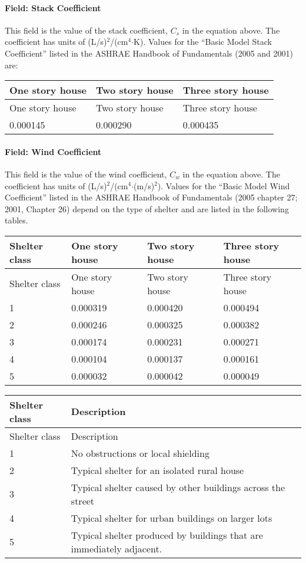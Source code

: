 \paragraph{Field: Stack Coefficient}\label{field-stack-coefficient}

This field is the value of the stack coefficient, \({C_s}\) in the equation above. The coefficient has units of (L/s)\(^{2}\)/(cm\(^{4}\)$\cdot$K). Values for the ``Basic Model Stack Coefficient'' listed in the ASHRAE Handbook of Fundamentals (2005 and 2001) are:

\begin{longtable}[c]{@{}lll@{}}
\toprule
One story house & Two story house & Three story house \tabularnewline
\midrule
\endfirsthead

\toprule
One story house & Two story house & Three story house \tabularnewline
\midrule
\endhead

0.000145 & 0.000290 & 0.000435 \tabularnewline
\bottomrule
\end{longtable}

\paragraph{Field: Wind Coefficient}\label{field-wind-coefficient}

This field is the value of the wind coefficient, \({C_w}\) in the equation above. The coefficient has units of (L/s)\(^{2}\)/(cm\(^{4}\)$\cdot$(m/s)\(^{2}\)). Values for the ``Basic Model Wind Coefficient'' listed in the ASHRAE Handbook of Fundamentals (2005 chapter 27; 2001, Chapter 26) depend on the type of shelter and are listed in the following tables.

\begin{longtable}[c]{@{}llll@{}}
\toprule
Shelter class & One story house & Two story house & Three story house \tabularnewline
\midrule
\endfirsthead

\toprule
Shelter class & One story house & Two story house & Three story house \tabularnewline
\midrule
\endhead

1 & 0.000319 & 0.000420 & 0.000494 \tabularnewline
2 & 0.000246 & 0.000325 & 0.000382 \tabularnewline
3 & 0.000174 & 0.000231 & 0.000271 \tabularnewline
4 & 0.000104 & 0.000137 & 0.000161 \tabularnewline
5 & 0.000032 & 0.000042 & 0.000049 \tabularnewline
\bottomrule
\end{longtable}

\begin{longtable}[c]{p{1.5in}p{4.5in}}
\toprule
Shelter class & Description \tabularnewline
\midrule
\endfirsthead

\toprule
Shelter class & Description \tabularnewline
\midrule
\endhead

1 & No obstructions or local shielding \tabularnewline
2 & Typical shelter for an isolated rural house \tabularnewline
3 & Typical shelter caused by other buildings across the street \tabularnewline
4 & Typical shelter for urban buildings on larger lots \tabularnewline
5 & Typical shelter produced by buildings that are immediately adjacent. \tabularnewline
\bottomrule
\end{longtable}

